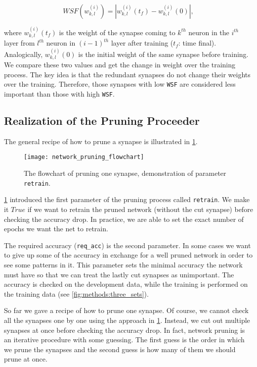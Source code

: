 \begin{equation} \label{eq:weight_significance_factor}
WSF(w_{k,l}^{(i)}) = | w_{k,l}^{(i)} (t_f) - w_{k,l}^{(i)} (0) | ,
\end{equation}

where $ w_{k,l}^{(i)} (t_f) $ is the weight of the synapse coming to $ k^{th} $ neuron in the $ i^{th} $ layer from $ l^{th} $ neuron in $ (i-1)^{th} $ layer after training ($ t_f $: time final). Analogically, $ w_{k,l}^{(i)} (0) $ is the initial weight of the same synapse before training. We compare these two values and get the change in weight over the training process. The key idea is that the redundant synapses do not change their weights over the training. Therefore, those synapses with low \texttt{WSF} are considered less important than those with high \texttt{WSF}.

\subsection*{Realization of the Pruning Proceeder}
The general recipe of how to prune a synapse is illustrated in \cref{fig:methods:network_pruning_flowchart}.

\begin{figure}[H]
  \centering
  \texttt{[image: network\_pruning\_flowchart]}
  \caption{The flowchart of pruning one synapse, demonstration of parameter \texttt{retrain}.}
  \label{fig:methods:network_pruning_flowchart}
\end{figure}

\cref{fig:methods:network_pruning_flowchart} introduced the first parameter of the pruning process called \texttt{retrain}. We make it $ True $ if we want to retrain the pruned network (without the cut synapse) before checking the accuracy drop. In practice, we are able to set the exact number of epochs we want the net to retrain.

The required accuracy (\texttt{req\_acc}) is the second parameter. In some cases we want to give up some of the accuracy in exchange for a well pruned network in order to see some patterns in it. This parameter sets the minimal accuracy the network must have so that we can treat the lastly cut synapses as unimportant. The accuracy is checked on the development data, while the training is performed on the training data (see \cref{fig:methods:three_sets}).

So far we gave a recipe of how to prune one synapse. Of course, we cannot check all the synapses one by one using the approach in \cref{fig:methods:network_pruning_flowchart}. Instead, we cut out multiple synapses at once before checking the accuracy drop. In fact, network pruning is an iterative procedure with some guessing. The first guess is the order in which we prune the synapses and the second guess is how many of them we should prune at once.

